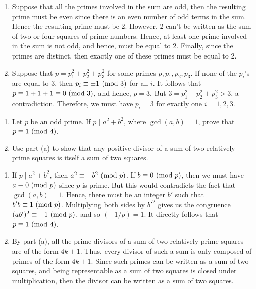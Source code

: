 \begin{solution}
    \begin{enumerate}
        \item Suppose that all the primes involved in the sum are odd, then the resulting prime must be even since there is an even number of odd terms in the sum. Hence the resulting prime must be 2. However, 2 can't be written as the sum of two or four squares of prime numbers. Hence, at least one prime involved in the sum is not odd, and hence, must be equal to 2. Finally, since the primes are distinct, then exactly one of these primes must be equal to 2.
        \item Suppose that $p = p_1^2 + p_2^2 + p_3^2$ for some primes $p, p_1, p_2, p_3$. If none of the $p_i$'s are equal to 3, then $p_i \equiv \pm 1 \ (\mathrm{mod}\ 3)$ for all $i$. It follows that $p \equiv 1 + 1 + 1 \equiv 0 \ (\mathrm{mod}\ 3)$, and hence, $p = 3$. But $3 = p_1^2 + p_2^2 + p_3^2 > 3$, a contradiction. Therefore, we must have $p_i = 3$ for exactly one $i = 1,2,3$. \\
    \end{enumerate}
\end{solution}

\begin{exercise}
    \begin{enumerate}
        \item Let $p$ be an odd prime. If $p \mid a^2 + b^2$, where $\gcd(a,b) = 1$, prove that $p \equiv 1 \ (\mathrm{mod}\ 4)$.  
        \item Use part (a) to show that any positive divisor of a sum of two relatively prime squares is itself a sum of two squares. \\
    \end{enumerate}
\end{exercise}

\begin{solution}
    \begin{enumerate}
        \item If $p \mid a^2 + b^2$, then $a^2 \equiv -b^2\ (\mathrm{mod}\ p)$. If $b \equiv 0 \ (\mathrm{mod}\ p)$, then we must have $a \equiv 0 \ (\mathrm{mod}\ p)$ since $p$ is prime. But this would contradicts the fact that $\gcd(a,b) = 1$. Hence, there must be an integer $b'$ such that $b'b \equiv 1 \ (\mathrm{mod}\ p)$. Multiplying both sides by $b'^2$ gives us the congruence $(ab')^2 \equiv -1 \ (\mathrm{mod}\ p)$, and so $(-1/p) = 1$. It directly follows that $p \equiv 1 \ (\mathrm{mod}\ 4)$.
        \item By part (a), all the prime divisors of a sum of two relatively prime squares are of the form $4k+1$. Thus, every divisor of such a sum is only composed of primes of the form $4k+1$. Since such primes can be written as a sum of two squares, and being representable as a sum of two squares is closed under multiplication, then the divisor can be written as a sum of two squares. \\
    \end{enumerate}
\end{solution}

